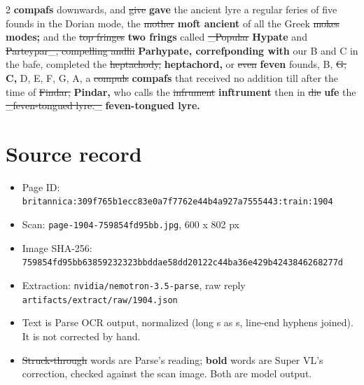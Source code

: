 \documentclass[10pt]{article}
\begin{document}
\begin{multicols}{2}
\textbf{compafs} downwards, and \sout{give} \textbf{gave} the ancient lyre a regular feries of five founds in the Dorian mode, the \sout{mother} \textbf{moft ancient} of all the Greek \sout{mokes} \textbf{modes;} and the \sout{top fringes} \textbf{two frings} called \sout{\_Popular} \textbf{Hypate} and \sout{Parteypar\_, compelling andlii} \textbf{Parhypate, correfponding with} our B and C in the bafe, completed the \sout{heptachody,} \textbf{heptachord,} or \sout{even} \textbf{feven} founds, B, \sout{G,} \textbf{C,} D, E, F, G, A, a \sout{compuls} \textbf{compafs} that received no addition till after the time of \sout{Findar,} \textbf{Pindar,} who calls the \sout{infrument} \textbf{inftrument} then in \sout{die} \textbf{ufe} the \sout{\_feven-tongued lyre.\_} \textbf{feven-tongued lyre.}
\end{multicols}
\section*{Source record}
\begin{itemize}
\item Page ID: \texttt{britannica:309f765b1ecc83e0a7f7762e44b4a927a7555443:train:1904}
\item Scan: \texttt{page-1904-759854fd95bb.jpg}, 600 x 802 px
\item Image SHA-256: \texttt{\small 759854fd95bb63859232323bbddae58dd20122c44ba36e429b4243846268277d}
\item Extraction: \texttt{nvidia/nemotron-3.5-parse}, raw reply \texttt{artifacts/extract/raw/1904.json}
\item Text is Parse OCR output, normalized (long s as s, line-end hyphens joined). It is not corrected by hand.
\item \sout{Struck-through} words are Parse's reading; \textbf{bold} words are Super VL's correction, checked against the scan image. Both are model output.
\end{itemize}
\end{document}
